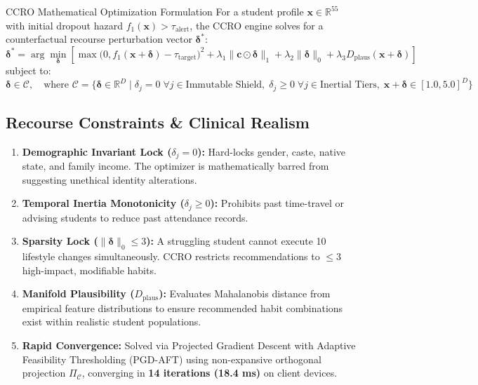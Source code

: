 \documentclass[10pt,a4paper]{article}
\begin{document}
\begin{recoursebox}{CCRO Mathematical Optimization Formulation}
For a student profile $\mathbf{x} \in \mathbb{R}^{55}$ with initial dropout hazard $f_1(\mathbf{x}) > \tau_{\text{alert}}$, the CCRO engine solves for a counterfactual recourse perturbation vector $\boldsymbol{\delta}^*$:
\begin{equation}
  \boldsymbol{\delta}^* = \arg\min_{\boldsymbol{\delta}} \left[ \max\big(0, f_1(\mathbf{x} + \boldsymbol{\delta}) - \tau_{\text{target}}\big)^2 + \lambda_1 \|\mathbf{c} \odot \boldsymbol{\delta}\|_1 + \lambda_2 \|\boldsymbol{\delta}\|_0 + \lambda_3 D_{\text{plaus}}(\mathbf{x} + \boldsymbol{\delta}) \right]
\end{equation}
subject to:
\begin{equation}
  \boldsymbol{\delta} \in \mathcal{C}, \quad \text{where } \mathcal{C} = \big\{ \boldsymbol{\delta} \in \mathbb{R}^D \mid \delta_j = 0 \; \forall j \in \text{Immutable Shield}, \; \delta_j \ge 0 \; \forall j \in \text{Inertial Tiers}, \; \mathbf{x} + \boldsymbol{\delta} \in [1.0, 5.0]^D \big\}
\end{equation}
\end{recoursebox}

\subsection{Recourse Constraints \& Clinical Realism}
\begin{enumerate}[noitemsep, topsep=2pt]
  \item \textbf{Demographic Invariant Lock ($\delta_j = 0$):} Hard-locks gender, caste, native state, and family income. The optimizer is mathematically barred from suggesting unethical identity alterations.
  \item \textbf{Temporal Inertia Monotonicity ($\delta_j \ge 0$):} Prohibits past time-travel or advising students to reduce past attendance records.
  \item \textbf{Sparsity Lock ($\|\boldsymbol{\delta}\|_0 \le 3$):} A struggling student cannot execute 10 lifestyle changes simultaneously. CCRO restricts recommendations to $\le 3$ high-impact, modifiable habits.
  \item \textbf{Manifold Plausibility ($D_{\text{plaus}}$):} Evaluates Mahalanobis distance from empirical feature distributions to ensure recommended habit combinations exist within realistic student populations.
  \item \textbf{Rapid Convergence:} Solved via Projected Gradient Descent with Adaptive Feasibility Thresholding (PGD-AFT) using non-expansive orthogonal projection $\Pi_{\mathcal{C}}$, converging in \textbf{14 iterations (18.4 ms)} on client devices.
\end{enumerate}
\end{document}
